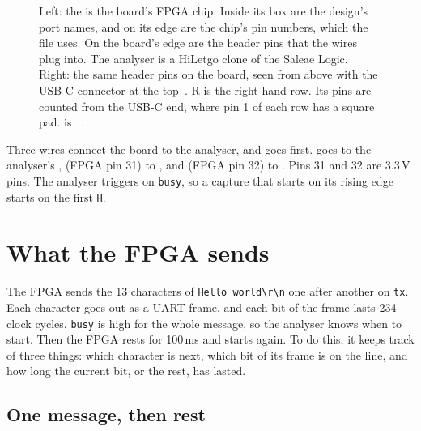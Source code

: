 \documentclass[11pt,a4paper]{article}
\begin{document}
\begin{figure}[H]
\begin{minipage}[c]{0.77\linewidth}
  \end{minipage}\hfill
  \begin{minipage}[c]{0.2\linewidth}
  \centering
  \end{minipage}
  \caption{Left: the  is the board’s FPGA chip. Inside its box are the design’s port names, and on its edge are the chip’s pin numbers, which the  file uses. On the board’s edge are the header pins that the wires plug into. The analyser is a HiLetgo clone of the Saleae Logic. Right: the same header pins on the board, seen from above with the USB-C connector at the top~\cite{topview}. R is the right-hand row. Its pins are counted from the USB-C end, where pin 1 of each row has a square pad.  is ~\cite[p.~2]{schematic}.}
\end{figure}

Three wires connect the board to the analyser, and  goes first.  goes to the analyser’s ,  (FPGA pin 31) to , and  (FPGA pin 32) to . Pins 31 and 32 are 3.3\,V pins. The analyser triggers on \texttt{busy}, so a capture that starts on its rising edge starts on the first \texttt{H}.

\section*{What the FPGA sends}

The FPGA sends the 13 characters of \texttt{Hello world\textbackslash r\textbackslash n} one after another on \texttt{tx}. Each character goes out as a UART frame, and each bit of the frame lasts 234 clock cycles. \texttt{busy} is high for the whole message, so the analyser knows when to start. Then the FPGA rests for 100\,ms and starts again. To do this, it keeps track of three things: which character is next, which bit of its frame is on the line, and how long the current bit, or the rest, has lasted.

\subsection*{One message, then rest}
\end{document}
